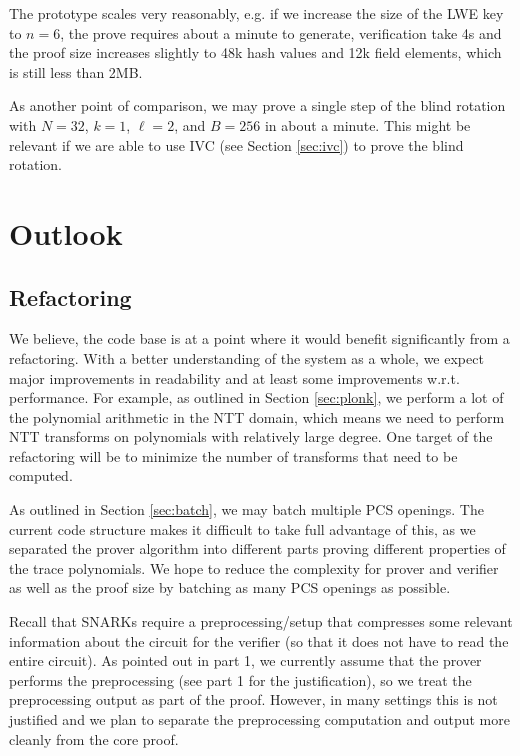 \documentclass{zamarep}
\begin{document}
The prototype scales very reasonably, e.g. if we increase the size of the LWE key to $n=6$, the prove requires about a minute to generate, verification take 4s and the proof size increases slightly to 48k hash values and 12k field elements, which is still less than 2MB.

As another point of comparison, we may prove a single step of the blind rotation with $N=32$, $k=1$, $\ell=2$, and $B=256$ in about a minute. This might be relevant if we are able to use IVC (see Section \ref{sec:ivc}) to prove the blind rotation.

\section{Outlook}
\label{sec:out}

\subsection{Refactoring}
\label{sec:refactor}

We believe, the code base is at a point where it would benefit significantly from a refactoring. With a better understanding of the system as a whole, we expect major improvements in readability and at least some improvements w.r.t. performance. For example, as outlined in Section \ref{sec:plonk}, we perform a lot of the polynomial arithmetic in the NTT domain, which means we need to perform NTT transforms on polynomials with relatively large degree. One target of the refactoring will be to minimize the number of transforms that need to be computed.

As outlined in Section \ref{sec:batch}, we may batch multiple PCS openings. The current code structure makes it difficult to take full advantage of this, as we separated the prover algorithm into different parts proving different properties of the trace polynomials. We hope to reduce the complexity for prover and verifier as well as the proof size by batching as many PCS openings as possible.

Recall that SNARKs require a preprocessing/setup that compresses some relevant information about the circuit for the verifier (so that it does not have to read the entire circuit). As pointed out in part 1, we currently assume that the prover performs the preprocessing (see part 1 for the justification), so we treat the preprocessing output as part of the proof. However, in many settings this is not justified and we plan to separate the preprocessing computation and output more cleanly from the core proof.
\end{document}

